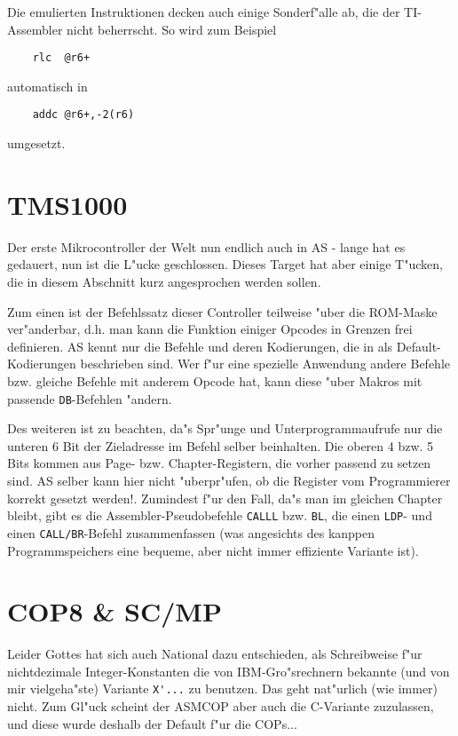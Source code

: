 \documentclass[12pt,a4paper,twoside]{report}
\newcommand{\tty}[1]{{\tt #1}}
\begin{document}
Die emulierten Instruktionen decken auch einige Sonderf"alle ab,
die der TI-Assembler nicht beherrscht.  So wird zum Beispiel
\begin{verbatim}
    rlc  @r6+
\end{verbatim}
automatisch in
\begin{verbatim}
    addc @r6+,-2(r6)
\end{verbatim}
umgesetzt.


\section{TMS1000}

Der erste Mikrocontroller der Welt nun endlich auch in AS - lange hat es
gedauert, nun ist die L"ucke geschlossen.  Dieses Target hat aber einige
T"ucken, die in diesem Abschnitt kurz angesprochen werden sollen.

Zum einen ist der Befehlssatz dieser Controller teilweise "uber die ROM-Maske
ver"anderbar, d.h. man kann die Funktion einiger Opcodes in Grenzen frei
definieren.  AS kennt nur die Befehle und deren Kodierungen, die in
\cite{TMS1000PGMRef} als Default-Kodierungen beschrieben sind.  Wer f"ur eine
spezielle Anwendung andere Befehle bzw. gleiche Befehle mit anderem Opcode
hat, kann diese "uber Makros mit passende \tty{DB}-Befehlen "andern.

Des weiteren ist zu beachten, da"s Spr"unge und Unterprogrammaufrufe nur die
unteren 6 Bit der Zieladresse im Befehl selber beinhalten.  Die oberen 4 bzw.
5 Bits kommen aus Page- bzw. Chapter-Registern, die vorher passend zu setzen
sind.  AS selber kann hier nicht "uberpr"ufen, ob die Register vom Programmierer
korrekt gesetzt werden!.  Zumindest f"ur den Fall, da"s man im gleichen Chapter
bleibt, gibt es die Assembler-Pseudobefehle \tty{CALLL} bzw.
\tty{BL}, die einen \tty{LDP}- und einen \tty{CALL/BR}-Befehl zusammenfassen
(was angesichts des kanppen Programmspeichers eine bequeme, aber nicht immer
effiziente Variante ist).


\section{COP8 \& SC/MP}
\label{COP8Spec}

Leider Gottes hat sich auch National dazu entschieden, als
Schreibweise f"ur nichtdezimale Integer-Konstanten die von
IBM-Gro"srechnern bekannte (und von mir vielgeha"ste) Variante
\verb!X'...! zu benutzen.  Das geht nat"urlich (wie immer) nicht.
Zum Gl"uck scheint der ASMCOP aber auch die C-Variante zuzulassen,
und diese wurde deshalb der Default f"ur die COPs...
\end{document}
